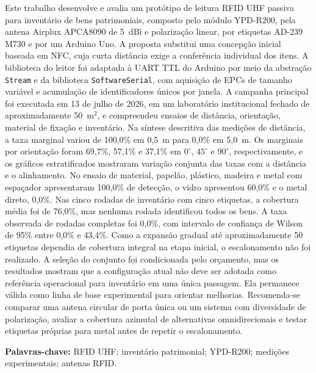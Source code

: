 %
%

\begin{resumo}

Este trabalho desenvolve e avalia um protótipo de leitura RFID UHF passiva para inventário de bens patrimoniais, composto pelo módulo YPD-R200, pela antena Airplux APCA8090 de 5~dBi e polarização linear, por etiquetas AD-239 M730 e por um Arduino Uno. A proposta substitui uma concepção inicial baseada em NFC, cuja curta distância exige a conferência individual dos itens. A biblioteca do leitor foi adaptada à UART TTL do Arduino por meio da abstração \texttt{Stream} e da biblioteca \texttt{SoftwareSerial}, com aquisição de EPCs de tamanho variável e acumulação de identificadores únicos por janela. A campanha principal foi executada em 13 de julho de 2026, em um laboratório institucional fechado de aproximadamente 50~m$^2$, e compreendeu ensaios de distância, orientação, material de fixação e inventário. Na síntese descritiva das medições de distância, a taxa marginal variou de 100,0\% em 0,5~m para 0,0\% em 5,0~m. Os marginais por orientação foram 69,7\%, 57,1\% e 37,1\% em $0^\circ$, $45^\circ$ e $90^\circ$, respectivamente, e os gráficos estratificados mostraram variação conjunta das taxas com a distância e o alinhamento. No ensaio de material, papelão, plástico, madeira e metal com espaçador apresentaram 100,0\% de detecção, o vidro apresentou 60,0\% e o metal direto, 0,0\%. Nas cinco rodadas de inventário com cinco etiquetas, a cobertura média foi de 76,0\%, mas nenhuma rodada identificou todos os bens. A taxa observada de rodadas completas foi 0,0\%, com intervalo de confiança de Wilson de 95\% entre 0,0\% e 43,4\%. Como a expansão gradual até aproximadamente 50 etiquetas dependia de cobertura integral na etapa inicial, o escalonamento não foi realizado. A seleção do conjunto foi condicionada pelo orçamento, mas os resultados mostram que a configuração atual não deve ser adotada como referência operacional para inventário em uma única passagem. Ela permanece válida como linha de base experimental para orientar melhorias. Recomenda-se comparar uma antena circular de porta única ou um sistema com diversidade de polarização, avaliar a cobertura azimutal de alternativas omnidirecionais e testar etiquetas próprias para metal antes de repetir o escalonamento.

\textbf{Palavras-chave:} RFID UHF; inventário patrimonial; YPD-R200; medições experimentais; antenas RFID.

\end{resumo}
